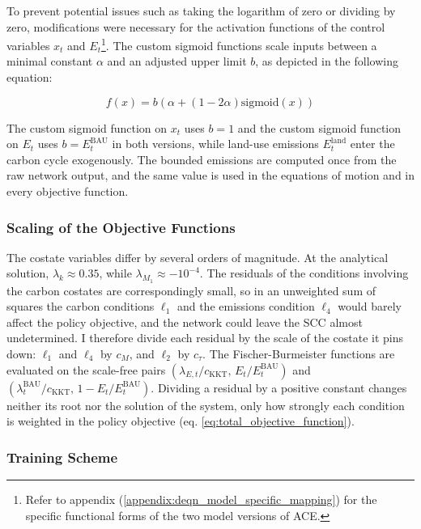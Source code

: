 To prevent potential issues such as taking the logarithm of zero or dividing by zero, modifications were necessary for the activation functions of the control variables \(x_t\) and \(E_t\)\footnote{Refer to appendix (\ref{appendix:deqn_model_specific_mapping}) for the specific functional forms of the two model versions of ACE.}. The custom sigmoid functions scale inputs between a minimal constant \(\alpha\) and an adjusted upper limit \(b\), as depicted in the following equation:

\begin{equation}
    f(x) = b \left( \alpha + (1-2\alpha)\text{sigmoid}(x) \right)
\end{equation}

The custom sigmoid function on \(x_t\) uses \(b=1\) and the custom sigmoid function on \(E_t\) uses \(b=E_t^\text{BAU}\) in both versions, while land-use emissions \(E_t^\text{land}\) enter the carbon cycle exogenously. The bounded emissions are computed once from the raw network output, and the same value is used in the equations of motion and in every objective function.

\subsubsection{Scaling of the Objective Functions}
\label{subsubsec:objective_scaling}

The costate variables differ by several orders of magnitude. At the analytical solution, \(\lambda_{k} \approx 0.35\), while \(\lambda_{M_1} \approx -10^{-4}\). The residuals of the conditions involving the carbon costates are correspondingly small, so in an unweighted sum of squares the carbon conditions \(\ell_1\) and the emissions condition \(\ell_4\) would barely affect the policy objective, and the network could leave the SCC almost undetermined. I therefore divide each residual by the scale of the costate it pins down: \(\ell_1\) and \(\ell_4\) by \(c_M\), and \(\ell_2\) by \(c_\tau\). The Fischer-Burmeister functions are evaluated on the scale-free pairs \((\lambda_{E,t}/c_{\text{KKT}},\, E_t/E_t^\text{BAU})\) and \((\lambda^\text{BAU}_t/c_{\text{KKT}},\, 1 - E_t/E_t^\text{BAU})\). Dividing a residual by a positive constant changes neither its root nor the solution of the system, only how strongly each condition is weighted in the policy objective (eq. \ref{eq:total_objective_function}).


\subsubsection{Training Scheme}

